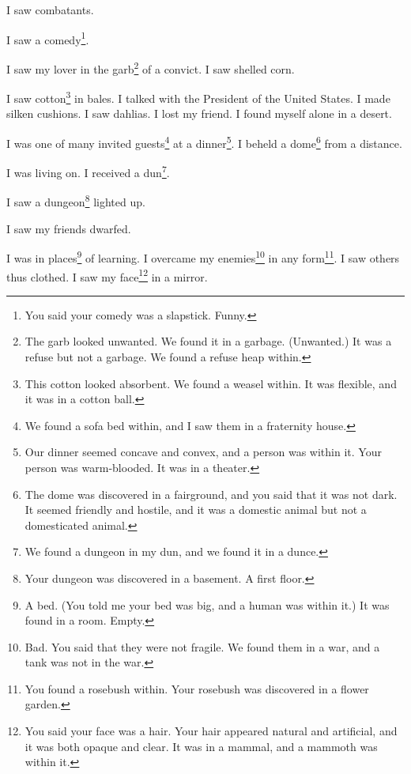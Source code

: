 \documentclass[12pt]{book}
\begin{document}
 I saw combatants. 

 I saw a comedy\footnote{You said your comedy was a slapstick. Funny.}. 

 I saw my lover in the garb\footnote{The garb looked unwanted. We found it in a garbage. (Unwanted.) It was a refuse but not a garbage. We found a refuse heap within.} of a convict. I saw shelled corn. 

 I saw cotton\footnote{This cotton looked absorbent. We found a weasel within. It was flexible, and it was in a cotton ball.} in bales. I talked with the President of the United States. I made silken cushions. I saw dahlias. I lost my friend. I found myself alone in a desert. 

 I was one of many invited guests\footnote{We found a sofa bed within, and I saw them in a fraternity house.} at a dinner\footnote{Our dinner seemed concave and convex, and a person was within it. Your person was warm-blooded. It was in a theater.}. I beheld a dome\footnote{The dome was discovered in a fairground, and you said that it was not dark. It seemed friendly and hostile, and it was a domestic animal but not a domesticated animal.} from a distance. 

 I was living on. I received a dun\footnote{We found a dungeon in my dun, and we found it in a dunce.}. 

 I saw a dungeon\footnote{Your dungeon was discovered in a basement. A first floor.} lighted up. 

 I saw my friends dwarfed. 

 I was in places\footnote{A bed. (You told me your bed was big, and a human was within it.) It was found in a room. Empty.} of learning. I overcame my enemies\footnote{Bad. You said that they were not fragile. We found them in a war, and a tank was not in the war.} in any form\footnote{You found a rosebush within. Your rosebush was discovered in a flower garden.}. I saw others thus clothed. I saw my face\footnote{You said your face was a hair. Your hair appeared natural and artificial, and it was both opaque and clear. It was in a mammal, and a mammoth was within it.} in a mirror. 
\end{document}
